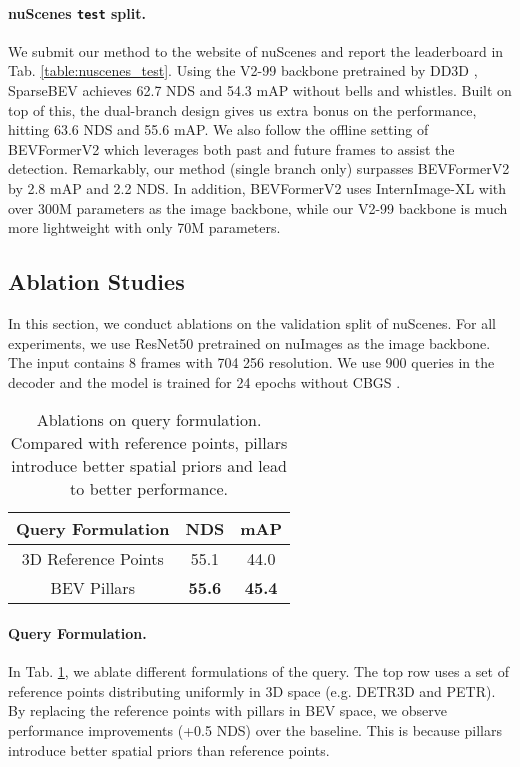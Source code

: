 \documentclass[10pt,twocolumn,letterpaper]{article}
\begin{document}
\vspace{-10pt}
\paragraph{nuScenes \texttt{test} split.} We submit our method to the website of nuScenes and report the leaderboard in Tab. \ref{table:nuscenes_test}.
Using the V2-99 \cite{vovnet2} backbone pretrained by DD3D \cite{dd3d}, SparseBEV achieves 62.7 NDS and 54.3 mAP without bells and whistles.
Built on top of this, the dual-branch design gives us extra bonus on the performance, hitting 63.6 NDS and 55.6 mAP.
We also follow the offline setting of BEVFormerV2 \cite{bevformerv2} which leverages both past and future frames to assist the detection.
Remarkably, our method (single branch only) surpasses BEVFormerV2 by 2.8 mAP and 2.2 NDS.
In addition, BEVFormerV2 uses InternImage-XL \cite{internimage} with over 300M parameters as the image backbone, while our V2-99 backbone is much more lightweight with only 70M parameters.

\subsection{Ablation Studies}

In this section, we conduct ablations on the validation split of nuScenes. For all experiments, we use ResNet50 pretrained on nuImages \cite{nuscenes} as the image backbone. The input contains 8 frames with 704  256 resolution. We use 900 queries in the decoder and the model is trained for 24 epochs without CBGS \cite{cbgs}.

\begin{table}[t]
  \centering
  \begin{tabular}{c|cc}
    \toprule
    Query Formulation & NDS & mAP \\
    \midrule
    3D Reference Points & 55.1 & 44.0 \\
    BEV Pillars & \textbf{55.6} & \textbf{45.4} \\
    \bottomrule
  \end{tabular}
  \caption{Ablations on query formulation. Compared with reference points, pillars introduce better spatial priors and lead to better performance.}
  \label{table:ablation_query}
\end{table}

\vspace{-5pt}
\paragraph{Query Formulation.} In Tab. \ref{table:ablation_query}, we ablate different formulations of the query. The top row uses a set of reference points distributing uniformly in 3D space (e.g. DETR3D and PETR). By replacing the reference points with pillars in BEV space, we observe performance improvements (+0.5 NDS) over the baseline. This is because pillars introduce better spatial priors than reference points.
\end{document}
